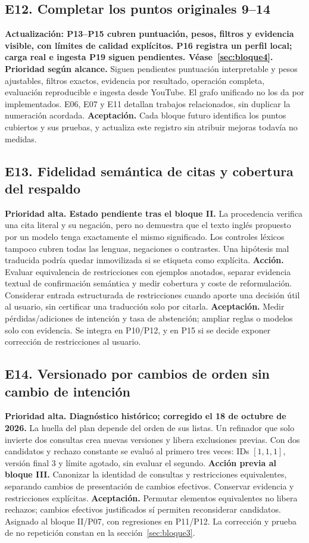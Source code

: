 \subsection{E12. Completar los puntos originales 9--14}
\textbf{Actualización: P13--P15 cubren puntuación, pesos, filtros y evidencia
visible, con límites de calidad explícitos. P16 registra un perfil local; carga
real e ingesta P19 siguen pendientes. Véase~\ref{sec:bloque4}.}
\textbf{Prioridad según alcance.} Siguen pendientes puntuación interpretable y
pesos ajustables, filtros exactos, evidencia por resultado, operación completa,
evaluación reproducible e ingesta desde YouTube. El grafo unificado no los da
por implementados. E06, E07 y E11 detallan trabajos relacionados, sin duplicar
la numeración acordada.
\textbf{Aceptación.} Cada bloque futuro identifica los puntos cubiertos y sus
pruebas, y actualiza este registro sin atribuir mejoras todavía no medidas.

\subsection{E13. Fidelidad semántica de citas y cobertura del respaldo}
\textbf{Prioridad alta. Estado pendiente tras el bloque II.} La procedencia
verifica una cita literal y su negación, pero no demuestra que el texto inglés
propuesto por un modelo tenga exactamente el mismo significado. Los controles
léxicos tampoco cubren todas las lenguas, negaciones o contrastes. Una hipótesis
mal traducida podría quedar inmovilizada si se etiqueta como explícita.
\textbf{Acción.} Evaluar equivalencia de restricciones con ejemplos anotados,
separar evidencia textual de confirmación semántica y medir cobertura y coste
de reformulación. Considerar entrada estructurada de restricciones cuando aporte
una decisión útil al usuario, sin certificar una traducción solo por citarla.
\textbf{Aceptación.} Medir pérdidas/adiciones de intención y tasa de abstención;
ampliar reglas o modelos solo con evidencia. Se integra en P10/P12, y en P15
si se decide exponer corrección de restricciones al usuario.

\subsection{E14. Versionado por cambios de orden sin cambio de intención}
\textbf{Prioridad alta. Diagnóstico histórico; corregido el 18 de octubre de 2026.}
La huella del plan depende del orden de sus listas. Un refinador que solo
invierte dos consultas crea nuevas versiones y libera exclusiones previas.
Con dos candidatos y rechazo constante se evaluó al primero tres veces:
IDs $[1,1,1]$, versión final 3 y límite agotado, sin evaluar el segundo.
\textbf{Acción previa al bloque III.} Canonizar la identidad de consultas y
restricciones equivalentes, separando cambios de presentación de cambios
efectivos. Conservar evidencia y restricciones explícitas.
\textbf{Aceptación.} Permutar elementos equivalentes no libera rechazos;
cambios efectivos justificados sí permiten reconsiderar candidatos.
Asignado al bloque II/P07, con regresiones en P11/P12. La corrección y prueba
de no repetición constan en la sección~\ref{sec:bloque3}.

